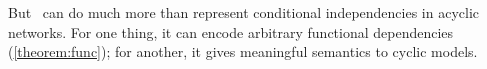 But \scibility\ can do much more than represent conditional independencies in acyclic networks. 
%
%
For one thing, it can encode arbitrary 
    functional dependencies (\cref{theorem:func});
for another, it gives meaningful semantics to cyclic models.
%
